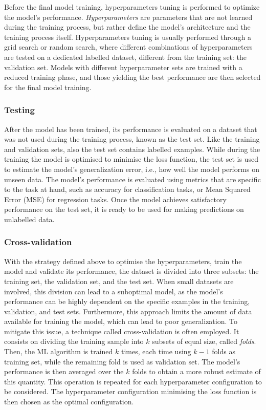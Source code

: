 Before the final model training, hyperparameters tuning is performed to optimize the model's performance. \emph{Hyperparameters} are parameters that are not learned during the training process, but rather define the model's architecture and the training process itself. Hyperparameters tuning is usually performed through a grid search or random search, where different combinations of hyperparameters are tested on a dedicated labelled dataset, different from the training set: the validation set. Models with different hyperparameter sets are trained with a reduced training phase, and those yielding the best performance are then selected for the final model training.

\subsubsection{Testing}
After the model has been trained, its performance is evaluated on a dataset that was not used during the training process, known as the test set. Like the training and validation sets, also the test set contains labelled examples. While during the training the model is optimised to minimise the loss function, the test set is used to estimate the model's generalization error, i.e., how well the model performs on unseen data. The model's performance is evaluated using metrics that are specific to the task at hand, such as accuracy for classification tasks, or Mean Squared Error (MSE) for regression tasks. Once the model achieves satisfactory performance on the test set, it is ready to be used for making predictions on unlabelled data.

\subsubsection{Cross-validation}

With the strategy defined above to optimise the hyperparameters, train the model and validate its performance, the dataset is divided into three subsets: the training set, the validation set, and the test set. When small datasets are involved, this division can lead to a suboptimal model, as the model's performance can be highly dependent on the specific examples in the training, validation, and test sets. Furthermore, this approach limits the amount of data available for training the model, which can lead to poor generalization. To mitigate this issue, a technique called cross-validation is often employed. It consists on dividing the training sample into $k$ subsets of equal size, called \emph{folds}. Then, the ML algorithm is trained $k$ times, each time using $k-1$ folds as training set, while the remaining fold is used as validation set. The model's performance is then averaged over the $k$ folds to obtain a more robust estimate of this quantity. This operation is repeated for each hyperparameter configuration to be considered. The hyperparameter configuration minimising the loss function is then chosen as the optimal configuration.


